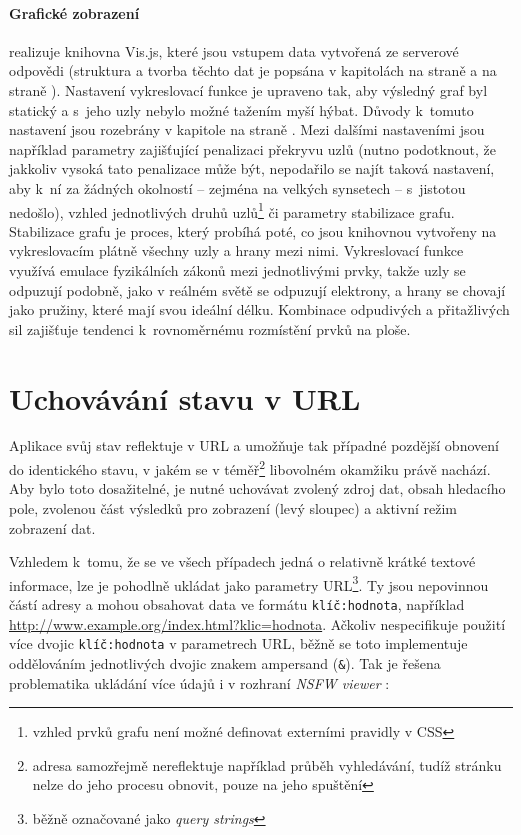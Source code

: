 \documentclass[a4paper, 11pt, oneside, showtrims]{book}
\newcommand{\simplywn}{\textit{NSFW viewer} }
\newcommand{\itNameRef}[1]{\textit{\nameref{#1}}}
\begin{document}
				\paragraph{Grafické zobrazení} realizuje knihovna Vis.js, které jsou vstupem data vytvořená ze serverové odpovědi (struktura a tvorba těchto dat je popsána v kapitolách \itNameRef{cha:answerStruct} na straně \pageref{cha:answerStruct} a \itNameRef{cha:zpracovani} na straně \pageref{cha:zpracovani}). Nastavení vykreslovací funkce je upraveno tak, aby výsledný graf byl statický a s~jeho uzly nebylo možné tažením myší hýbat. Důvody k~tomuto nastavení jsou rozebrány v kapitole \itNameRef{cha:graphui} na straně \pageref{cha:graphui}. Mezi dalšími nastaveními jsou například parametry zajišťující penalizaci překryvu uzlů (nutno podotknout, že jakkoliv vysoká tato penalizace může být, nepodařilo se najít taková nastavení, aby k~ní za žádných okolností -- zejména na velkých synsetech -- s~jistotou nedošlo), vzhled jednotlivých druhů uzlů\footnote{vzhled prvků grafu není možné definovat externími pravidly v CSS} či parametry stabilizace grafu. Stabilizace grafu je proces, který probíhá poté, co jsou knihovnou vytvořeny na vykreslovacím plátně všechny uzly a hrany mezi nimi. Vykreslovací funkce využívá emulace fyzikálních zákonů mezi jednotlivými prvky, takže uzly se odpuzují podobně, jako v reálném světě se odpuzují elektrony, a hrany se chovají jako pružiny, které mají svou ideální délku. Kombinace odpudivých a přitažlivých sil zajišťuje tendenci k~rovnoměrnému rozmístění prvků na ploše.

			\section{Uchovávání stavu v URL}

				Aplikace svůj stav reflektuje v URL a umožňuje tak případné pozdější obnovení do identického stavu, v jakém se v téměř\footnote{adresa samozřejmě nereflektuje například průběh vyhledávání, tudíž stránku nelze do jeho procesu obnovit, pouze na jeho spuštění} libovolném okamžiku právě nachází. Aby bylo toto dosažitelné, je nutné uchovávat zvolený zdroj dat, obsah hledacího pole, zvolenou část výsledků pro zobrazení (levý sloupec) a aktivní režim zobrazení dat. 

				Vzhledem k~tomu, že se ve všech případech jedná o relativně krátké textové informace, lze je pohodlně ukládat jako parametry URL\footnote{běžně označované jako \textit{query strings}}. Ty jsou nepovinnou částí adresy a mohou obsahovat data ve formátu \texttt{klíč:hodnota}, například \url{http://www.example.org/index.html?klic=hodnota}. \parencite{berners2005uniform} Ačkoliv \textcite{berners2005uniform} nespecifikuje použití více dvojic \texttt{klíč:hodnota} v parametrech URL, běžně se toto implementuje oddělováním jednotlivých dvojic znakem ampersand (\texttt{\&}). Tak je řešena problematika ukládání více údajů i v rozhraní \simplywn: 
\end{document}
